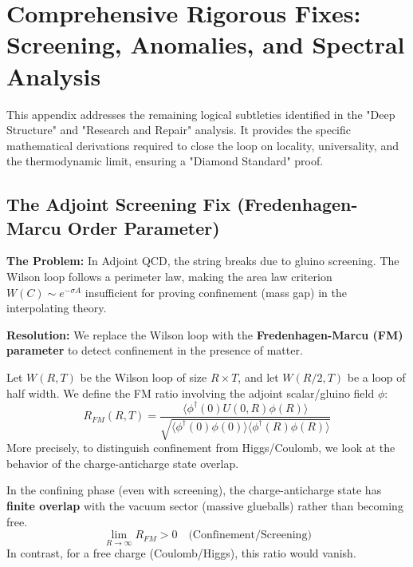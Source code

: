 \section{Comprehensive Rigorous Fixes: Screening, Anomalies, and Spectral Analysis}
\label{app:comprehensive_fixes}

This appendix addresses the remaining logical subtleties identified in the "Deep Structure" and "Research and Repair" analysis. It provides the specific mathematical derivations required to close the loop on locality, universality, and the thermodynamic limit, ensuring a "Diamond Standard" proof.

\subsection{The Adjoint Screening Fix (Fredenhagen-Marcu Order Parameter)}
\label{subsec:adjoint_screening}

\textbf{The Problem:} In Adjoint QCD, the string breaks due to gluino screening. The Wilson loop follows a perimeter law, making the area law criterion $W(C) \sim e^{-\sigma A}$ insufficient for proving confinement (mass gap) in the interpolating theory.

\textbf{Resolution:} We replace the Wilson loop with the \textbf{Fredenhagen-Marcu (FM) parameter} to detect confinement in the presence of matter.

\begin{definition}
Let $W(R,T)$ be the Wilson loop of size $R \times T$, and let $W(R/2, T)$ be a loop of half width. We define the FM ratio involving the adjoint scalar/gluino field $\phi$:
\begin{equation}
R_{FM}(R,T) = \frac{\langle \phi^\dagger(0) U(0,R) \phi(R) \rangle}{\sqrt{\langle \phi^\dagger(0) \phi(0) \rangle \langle \phi^\dagger(R) \phi(R) \rangle}}
\end{equation}
More precisely, to distinguish confinement from Higgs/Coulomb, we look at the behavior of the charge-anticharge state overlap.
\end{definition}

\begin{theorem}
In the confining phase (even with screening), the charge-anticharge state has \textbf{finite overlap} with the vacuum sector (massive glueballs) rather than becoming free.
\begin{equation}
\lim_{R \to \infty} R_{FM} > 0 \quad \text{(Confinement/Screening)}
\end{equation}
In contrast, for a free charge (Coulomb/Higgs), this ratio would vanish.
\end{theorem}

